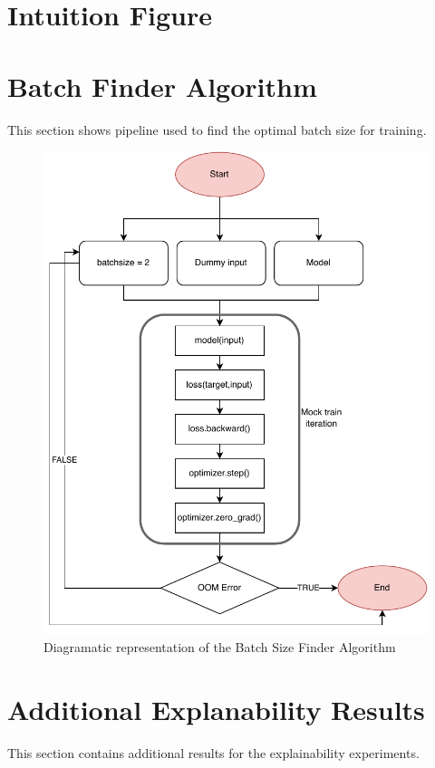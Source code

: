 \documentclass[a4paper,11pt,openright]{book}
\begin{document}
\section{Intuition Figure}
\section{Batch Finder Algorithm}
This section shows pipeline used to find the optimal batch size for training. 
\begin{figure}[!htb]
    \centering
    \includegraphics[width=0.6\linewidth]{images/batchsizefinder.pdf}
    \caption{Diagramatic representation of the Batch Size Finder Algorithm}
    \label{fig:bsfinder}
\end{figure}

\section{Additional Explanability Results}
This section contains additional results for the explainability experiments. 
\end{document}
